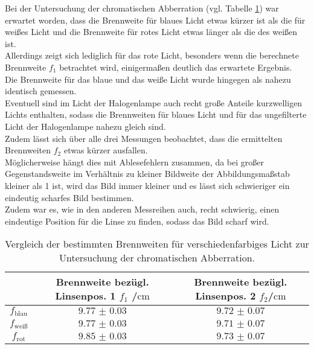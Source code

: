 Bei der Untersuchung der chromatischen Abberration (vgl. Tabelle \ref{tab:chroma}) war erwartet worden, dass die Brennweite für blaues Licht etwas kürzer ist als die für weißes Licht und die Brennweite für rotes Licht etwas länger als die des weißen ist.\\
Allerdings zeigt sich lediglich für das rote Licht, besonders wenn die berechnete Brennweite $f_\mathrm{1}$ betrachtet wird, einigermaßen deutlich das erwartete Ergebnis.
\\Die Brennweite für das blaue und das weiße Licht wurde hingegen als nahezu identisch gemessen.
\\Eventuell sind im Licht der Halogenlampe auch recht große Anteile kurzwelligen Lichts enthalten, sodass die Brennweiten für blaues Licht und für das ungefilterte Licht der Halogenlampe nahezu gleich sind.
\\ Zudem lässt sich über alle drei Messungen beobachtet, dass die ermittelten Brennweiten $f_\mathrm{2}$ etwas kürzer ausfallen. \\Möglicherweise hängt dies mit Ablesefehlern zusammen, da bei großer Gegenstandsweite im Verhältnis zu kleiner Bildweite der Abbildungsmaßstab kleiner als 1 ist, wird das Bild immer kleiner und es lässt sich schwieriger ein eindeutig scharfes Bild bestimmen.
\\Zudem war es, wie in den anderen Messreihen auch, recht schwierig, einen eindeutige Position für die Linse zu finden, sodass das Bild scharf wird.

\begin{table}
  \centering
  \caption{Vergleich der bestimmten Brennweiten für verschiedenfarbiges Licht zur Untersuchung der chromatischen Abberration.}
  \label{tab:chroma}
  \begin{tabular}{ccc}
    \toprule
    &Brennweite bezügl. Linsenpos. 1 $f_\mathrm{1}$ /$\si{\centi\meter}$&Brennweite bezügl. Linsenpos. 2 $f_\mathrm{2}$/$\si{\centi\meter}$\\
    \midrule
    $f_{\mathrm{blau}}$&$\num{9.77(3)}$&$\num{9.72(7)}$\\
    $f_{\mathrm{weiß}}$&$\num{9.77(3)}$&$\num{9.71(7)}$\\
    $f_{\mathrm{rot}}$&$\num{9.85(3)}$&$\num{9.73(7)}$\\
\bottomrule
\end{tabular}
\end{table}
